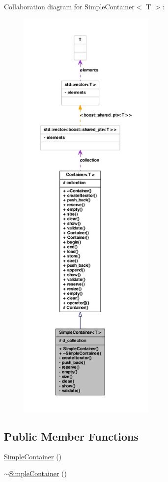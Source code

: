 Collaboration diagram for SimpleContainer$<$ T $>$:\nopagebreak
\begin{figure}[H]
\begin{center}
\leavevmode
\includegraphics[height=600pt]{class_simple_container__coll__graph}
\end{center}
\end{figure}
\subsection*{Public Member Functions}
\begin{DoxyCompactItemize}
\item 
\hyperlink{class_simple_container_a87d087aab51b4b6aad359ad906a90e4d}{SimpleContainer} ()
\item 
\hyperlink{class_simple_container_ad0704bf9c306ab57a9c4a2b83879670c}{$\sim$SimpleContainer} ()
\end{DoxyCompactItemize}
